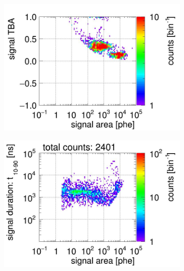 \begin{landscape}
\begin{figure}[!p]
\begin{subfigure}[t]{0.32\textwidth}
			\includegraphics[width=\figurewidth,clip,trim={0 8 0 40}]{Figures/GasTest/CutsValid/res64767/tbapaX07Vecfig64767.jpg}
			\caption{}
			\label{fig:signal selection 07}
		\end{subfigure}
		\begin{subfigure}[t]{0.32\textwidth}
			\centering
			\includegraphics[width=\figurewidth,clip,trim={0 98 0 15}]{Figures/GasTest/CutsValid/res64767/pdpa08Vecfig64767.jpg}

\end{subfigure}
\end{figure}
\end{landscape}
